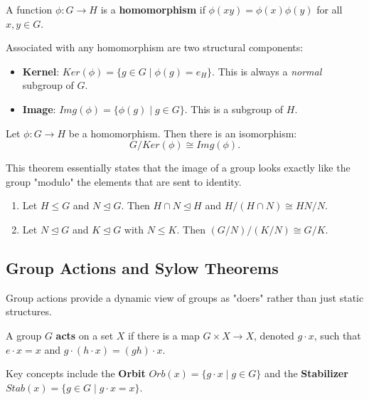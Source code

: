 \documentclass[oneside]{book}
\begin{document}
\begin{definition}[Homomorphism]
A function $\phi: G \to H$ is a \textbf{homomorphism} if $\phi(xy) = \phi(x)\phi(y)$ for all $x, y \in G$.
\end{definition}

Associated with any homomorphism are two structural components:
\begin{itemize}
    \item \textbf{Kernel}: $Ker(\phi) = \{g \in G \mid \phi(g) = e_H\}$. This is always a \textit{normal} subgroup of $G$.
    \item \textbf{Image}: $Img(\phi) = \{\phi(g) \mid g \in G\}$. This is a subgroup of $H$.
\end{itemize}

\begin{theorem}
Let $\phi: G \to H$ be a homomorphism. Then there is an isomorphism:
\[ G / Ker(\phi) \cong Img(\phi). \]
\end{theorem}
This theorem essentially states that the image of a group looks exactly like the group "modulo" the elements that are sent to identity.

\begin{theorem}
\begin{enumerate}
    \item Let $H \leq G$ and $N \trianglelefteq G$. Then $H \cap N \trianglelefteq H$ and $H/(H \cap N) \cong HN/N$.
    \item Let $N \trianglelefteq G$ and $K \trianglelefteq G$ with $N \leq K$. Then $(G/N)/(K/N) \cong G/K$.
\end{enumerate}
\end{theorem}

\subsection{Group Actions and Sylow Theorems}

Group actions provide a dynamic view of groups as "doers" rather than just static structures.

\begin{definition}
A group $G$ \textbf{acts} on a set $X$ if there is a map $G \times X \to X$, denoted $g \cdot x$, such that $e \cdot x = x$ and $g \cdot (h \cdot x) = (gh) \cdot x$.
\end{definition}

Key concepts include the \textbf{Orbit} $Orb(x) = \{g \cdot x \mid g \in G\}$ and the \textbf{Stabilizer} $Stab(x) = \{g \in G \mid g \cdot x = x\}$.
\end{document}
